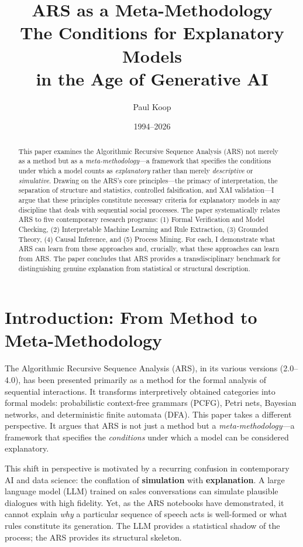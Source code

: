 \documentclass[12pt,a4paper]{article}
\title{\Huge\textbf{ARS as a Meta-Methodology} \\[2mm]
       \LARGE The Conditions for Explanatory Models \\[2mm]
       \LARGE in the Age of Generative AI}
\author{
  \large
  \begin{tabular}{c}
    Paul Koop
  \end{tabular}
}
\date{\large 1994--2026}
\begin{document}
\maketitle

\begin{abstract}
This paper examines the Algorithmic Recursive Sequence Analysis (ARS) not merely 
as a method but as a \textit{meta-methodology}—a framework that specifies the 
conditions under which a model counts as \textit{explanatory} rather than merely 
\textit{descriptive} or \textit{simulative}. Drawing on the ARS's core principles—the 
primacy of interpretation, the separation of structure and statistics, controlled 
falsification, and XAI validation—I argue that these principles constitute necessary 
criteria for explanatory models in any discipline that deals with sequential social 
processes. The paper systematically relates ARS to five contemporary research 
programs: (1) Formal Verification and Model Checking, (2) Interpretable Machine 
Learning and Rule Extraction, (3) Grounded Theory, (4) Causal Inference, and 
(5) Process Mining. For each, I demonstrate what ARS can learn from these 
approaches and, crucially, what these approaches can learn from ARS. The paper 
concludes that ARS provides a transdisciplinary benchmark for distinguishing 
genuine explanation from statistical or structural description.
\end{abstract}

\newpage
\tableofcontents
\newpage

\section{Introduction: From Method to Meta-Methodology}

The Algorithmic Recursive Sequence Analysis (ARS), in its various versions 
(2.0–4.0), has been presented primarily as a method for the formal analysis 
of sequential interactions. It transforms interpretively obtained categories 
into formal models: probabilistic context-free grammars (PCFG), Petri nets, 
Bayesian networks, and deterministic finite automata (DFA). This paper takes 
a different perspective. It argues that ARS is not just a method but a 
\textit{meta-methodology}—a framework that specifies the \textit{conditions} 
under which a model can be considered explanatory.

This shift in perspective is motivated by a recurring confusion in contemporary 
AI and data science: the conflation of \textbf{simulation} with \textbf{explanation}. 
A large language model (LLM) trained on sales conversations can simulate 
plausible dialogues with high fidelity. Yet, as the ARS notebooks have 
demonstrated, it cannot explain \textit{why} a particular sequence of speech 
acts is well-formed or what rules constitute its generation. The LLM provides 
a statistical shadow of the process; the ARS provides its structural skeleton.
\end{document}
